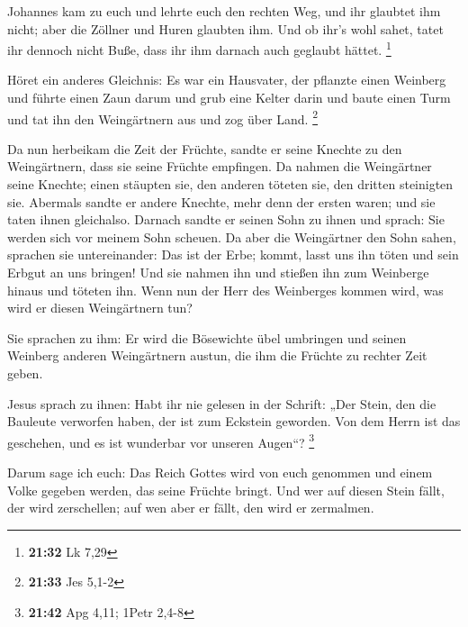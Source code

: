  Johannes kam zu euch und lehrte euch den rechten Weg,
und ihr glaubtet ihm nicht; aber die Zöllner und Huren glaubten ihm. Und
ob ihr's wohl sahet, tatet ihr dennoch nicht Buße, dass ihr ihm darnach
auch geglaubt hättet. \footnote{\textbf{21:32} Lk 7,29}

 Höret ein anderes Gleichnis: Es war ein Hausvater, der
pflanzte einen Weinberg und führte einen Zaun darum und grub eine Kelter
darin und baute einen Turm und tat ihn den Weingärtnern aus und zog über
Land. \footnote{\textbf{21:33} Jes 5,1-2}

 Da nun herbeikam die Zeit der Früchte, sandte er seine
Knechte zu den Weingärtnern, dass sie seine Früchte empfingen.
 Da nahmen die Weingärtner seine Knechte; einen stäupten
sie, den anderen töteten sie, den dritten steinigten sie.
 Abermals sandte er andere Knechte, mehr denn der ersten
waren; und sie taten ihnen gleichalso.  Darnach sandte er
seinen Sohn zu ihnen und sprach: Sie werden sich vor meinem Sohn
scheuen.  Da aber die Weingärtner den Sohn sahen,
sprachen sie untereinander: Das ist der Erbe; kommt, lasst uns ihn töten
und sein Erbgut an uns bringen!  Und sie nahmen ihn und
stießen ihn zum Weinberge hinaus und töteten ihn.  Wenn
nun der Herr des Weinberges kommen wird, was wird er diesen Weingärtnern
tun?

 Sie sprachen zu ihm: Er wird die Bösewichte übel
umbringen und seinen Weinberg anderen Weingärtnern austun, die ihm die
Früchte zu rechter Zeit geben.

 Jesus sprach zu ihnen: Habt ihr nie gelesen in der
Schrift: „Der Stein, den die Bauleute verworfen haben, der ist zum
Eckstein geworden. Von dem Herrn ist das geschehen, und es ist wunderbar
vor unseren Augen``? \footnote{\textbf{21:42} Apg 4,11; 1Petr 2,4-8}

 Darum sage ich euch: Das Reich Gottes wird von euch
genommen und einem Volke gegeben werden, das seine Früchte bringt.
 Und wer auf diesen Stein fällt, der wird zerschellen;
auf wen aber er fällt, den wird er zermalmen.


